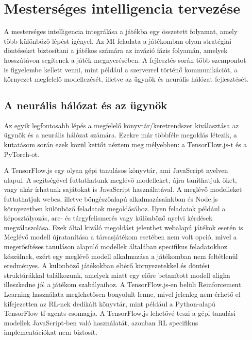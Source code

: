 \documentclass[
]{thesis-ekf}
\theoremstyle{definition}
\theoremstyle{remark}
\begin{document}

\chapter{Mesterséges intelligencia tervezése}

A mesterséges intelligencia integrálása a játékba egy összetett folyamat, amely több különböző lépést igényel. Az MI feladata a játékomban olyan stratégiai döntéseket biztosítani a játékos számára az invázió fázis folyamán, amelyek hosszútávon segítenek a játék megnyerésében. A fejlesztés során több szempontot is figyelembe kellett venni, mint például a szerverrel történő kommunikációt, a környezet megfelelő modellezését, illetve az ügynök és neurális hálózat fejlesztését.

\section{A neurális hálózat és az ügynök}

Az egyik legfontosabb lépés a megfelelő könyvtár/keretrendszer kiválasztása az ügynök és a neurális hálózat számára. Ezekre már többféle megoldás létezik, a kutatásom során ezek közül kettőt néztem meg mélyebben: a TensorFlow.js-t és a PyTorch-ot.

A TensorFlow.js egy olyan gépi tanulásos könyvtár, ami JavaScript nyelven alapul. A segítségével futtathatunk meglévő modelleket, újra taníthatjuk őket, vagy akár írhatunk sajátokat is JavaScript használatával. A meglévő modelleket futtathatjuk webes, illetve böngészőalapú alkalmazásainkban és Node.js környezetben különböző feladatok megoldásához. Ilyen feladatok például a képosztályozás, arc- és tárgyfelismerés vagy különböző nyelvi kérdések megválaszolása. Ezek által kiváló megoldást jelenthet webalapú játékok esetén is. Meglévő modell újratanítása a társasjátékom esetében nem volt opció, mivel a megerősítéses tanuláson alapuló modellek általában specifikus feladatokhoz készülnek, ezért egy meglévő modell alkalmazása a játékomban nem feltétlenül eredményes. A különböző játékokban eltérő környezetekkel és döntési struktúrákkal találkozunk, amelyek miatt egy előre betanított modell aligha illeszkedne jól a játékom szabályaihoz. A TensorFlow.js-en belüli Reinforcement Learning használata meglehetősen bonyolult lenne, mivel jelenleg nem érhető el kifejezetten az RL-nek dedikált könyvtár, mint például a Python-alapú TensorFlow tf-agents csomagja. A TensorFlow.js lehetővé teszi a gépi tanulási modellek JavaScript-ben való használatát, azonban RL specifikus implementációkat nem biztosít. \cite{TFJS}
\end{document}

